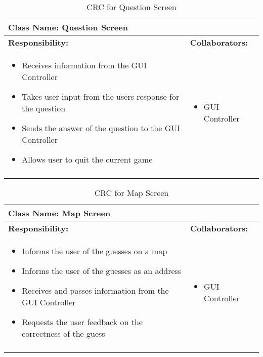 \documentclass[titlepage]{article}
\begin{document}
	\begin{longtable}{| p{} | p{} |}
			\hline
			 \multicolumn{2}{|l|}{\textbf{Class Name: Question Screen}} \\
			\hline
			\textbf{Responsibility:} & \textbf{Collaborators:} \\
			\hline
				\begin{itemize}
					\item Receives information from the GUI Controller
					\item Takes user input from the users response for the question
					\item Sends the answer of the question to the GUI Controller
					\item Allows user to quit the current game
				\end{itemize} & 
				\begin{itemize}
					\item GUI Controller
				\end{itemize} 
				\\
			\hline
		\caption{CRC for Question Screen}
	\end{longtable}	
	
	\begin{longtable}{| p{} | p{} |}
			\hline
			 \multicolumn{2}{|l|}{\textbf{Class Name: Map Screen}} \\
			\hline
			\textbf{Responsibility:} & \textbf{Collaborators:} \\
			\hline
				\begin{itemize}
					\item Informs the user of the guesses on a map
					\item Informs the user of the guesses as an address
					\item Receives and passes information from the GUI Controller
					\item Requests the user feedback on the correctness of the guess
				\end{itemize} & 
				\begin{itemize}
					\item GUI Controller
				\end{itemize} 
				\\
			\hline
		\caption{CRC for Map Screen}
	\end{longtable}
	
\end{document}
